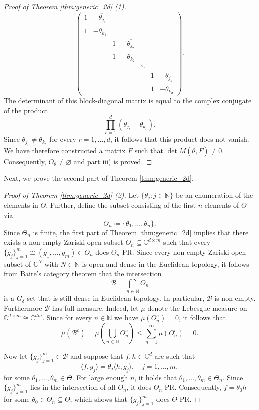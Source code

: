 \documentclass[reqno,a4paper,11pt]{amsart}
\numberwithin{equation}{section}
\def\N{{\mathbb N}}
\def\C{{\mathbb C}}
\newcommand\1{\mathds{1}}
\begin{document}
\begin{proof}[Proof of Theorem \ref{thm:generic_2d} (1)]
$$
\begin{pmatrix}
    1 & -\overline{\theta_{j_1}} & & & \\
    1 & -\overline{\theta_{k_1}} & & & \\
    & & 1 & -\overline{\theta_{j_2}} & \\
    & & 1 & -\overline{\theta_{k_2}} & \\
    & & & & \ddots \\
    & & & & & 1 & -\overline{\theta_{j_d}}\\
    & & & & & 1 & -\overline{\theta_{k_d}}
\end{pmatrix}.
$$
The determinant of this block-diagonal matrix is equal to the complex conjugate of the product
$$
\prod_{r=1}^d \left ( \theta_{j_r} - \theta_{k_r} \right ).
$$
Since $\theta_{j_r} \neq \theta_{k_r}$ for every $r = 1, \dots, d$, it follows that this product does not vanish. We have therefore constructed a matrix $F$ such that $\det M(\bar{\theta},F) \neq 0$. Consequently, $O_\theta \neq \varnothing$ and part iii) is proved.
\end{proof}

Next, we prove the second part of Theorem \ref{thm:generic_2d}.

\begin{proof}[Proof of Theorem \ref{thm:generic_2d} (2)]
    Let $\{ \theta_j : j \in \N \}$ be an enumeration of the elements in $\Theta$. Further, define the subset consisting of the first $n$ elements of $\Theta$ via
    $$
    \Theta_n \coloneqq \{ \theta_1, \dots, \theta_n \}.
    $$
    Since $\Theta_n$ is finite, the first part of Theorem \ref{thm:generic_2d} implies that there exists a non-empty Zariski-open subset $O_n \subseteq \C^{d \times m}$ such that every $\{g_j\}_{j=1}^{m} \cong (g_1,\dots, g_{m}) \in O_n$ does $\Theta_n$-PR. Since every non-empty Zariski-open subset of $\C^N$ with $N \in \N$ is open and dense in the Euclidean topology, it follows from Baire's category theorem that the intersection
    $$
    \mathcal{B} = \bigcap_{n \in \N} O_n
    $$
    is a $G_\delta$-set that is still dense in Euclidean topology. In particular, $\mathcal{B}$ is non-empty. Furthermore $\mathcal{B}$ has full measure. Indeed, let $\mu$ denote the Lebesgue measure on $\C^{d \times m} \cong \C^{dm}$. Since for every $n\in \N$ we have $\mu(O_n^c)=0$, it follows that
    $$\mu(\mathcal{B}^c) = \mu(\bigcup_{n\in \N} O_n^c) \leq \sum_{n=1}^\infty \mu(O_n^c) = 0.$$
    
    Now let $\{ g_j \}_{j=1}^{m} \in \mathcal{B}$ and suppose that $f,h \in \C^d$ are such that
    $$
    \langle f,g_j \rangle = \theta_j \langle h,g_j \rangle, \quad j = 1,\dots,m,
    $$
    for some $\theta_1, \dots, \theta_{m} \in \Theta$. For large enough $n$, it holds that $\theta_1, \dots, \theta_{m} \in \Theta_n$. Since $\{ g_j \}_{j=1}^{m}$ lies in the intersection of all $O_n$, it does $\Theta_n$-PR. Consequently, $f=\theta_0 h$ for some $\theta_0 \in \Theta_n \subseteq \Theta$, which shows that $\{ g_j \}_{j=1}^{m}$ does $\Theta$-PR.
\end{proof}
\end{document}
